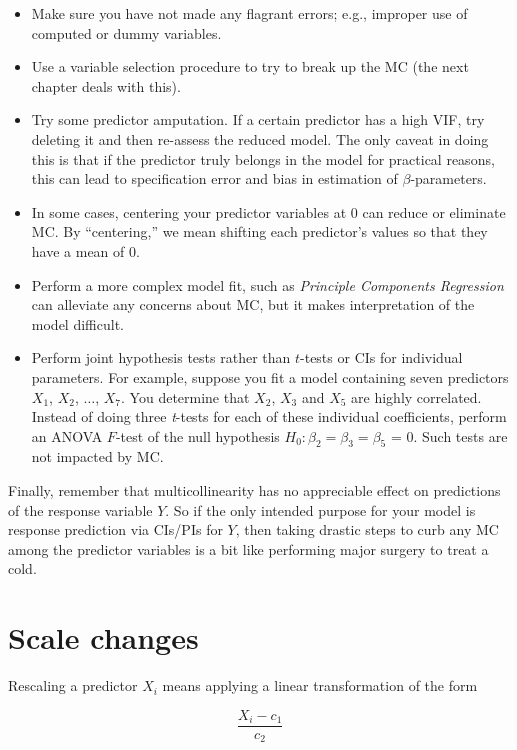 \documentclass[
]{book}
\providecommand{\tightlist}{%
  \setlength{\itemsep}{0pt}\setlength{\parskip}{0pt}}
\begin{document}
\begin{itemize}
\tightlist
\item
  Make sure you have not made any flagrant errors; e.g., improper use of computed or dummy variables.
\item
  Use a variable selection procedure to try to break up the MC (the next chapter deals with this).
\item
  Try some predictor amputation. If a certain predictor has a high VIF, try deleting it and then re-assess the reduced model. The only caveat in doing this is that if the predictor truly belongs in the model for practical reasons, this can lead to specification error and bias in estimation of \(\beta\)-parameters.
\item
  In some cases, centering your predictor variables at 0 can reduce or eliminate MC. By ``centering,'' we mean shifting each predictor's values so that they have a mean of 0.
\item
  Perform a more complex model fit, such as \emph{Principle Components Regression} can alleviate any concerns about MC, but it makes interpretation of the model difficult.
\item
  Perform joint hypothesis tests rather than \(t\)-tests or CIs for individual parameters. For example, suppose you fit a model containing seven predictors \(X_1\), \(X_2\), \(\ldots\), \(X_7\). You determine that \(X_2\), \(X_3\) and \(X_5\) are highly correlated. Instead of doing three \emph{t}-tests for each of these individual coefficients, perform an ANOVA \(F\)-test of the null hypothesis \(H_0: \beta_2 = \beta_3 = \beta_5\) = 0. Such tests are not impacted by MC.
\end{itemize}

Finally, remember that multicollinearity has no appreciable effect on predictions of the response variable \(Y\). So if the only intended purpose for your model is response prediction via CIs/PIs for \(Y\), then taking drastic steps to curb any MC among the predictor variables is a bit like performing major surgery to treat a cold.

\hypertarget{standardizingPredictors}{%
\section{Scale changes}\label{standardizingPredictors}}

Rescaling a predictor \(X_i\) means applying a linear transformation of the form

\[\frac{X_i - c_1}{c_2}\]
\end{document}
